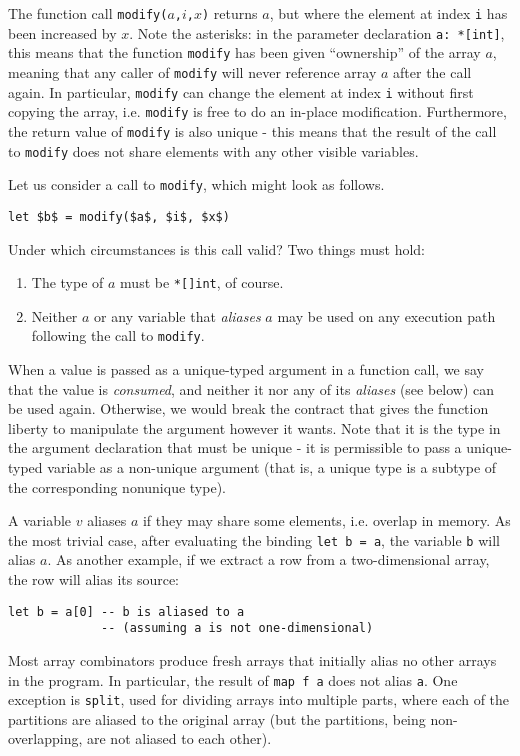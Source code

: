 \documentclass[oneside,11pt]{book}
\begin{document}
The function call \texttt{modify($a$,$i$,$x$)} returns $a$, but where
the element at index \texttt{i} has been increased by $x$.  Note the
asterisks: in the parameter declaration \texttt{a: *[int]}, this means
that the function \texttt{modify} has been given ``ownership'' of the
array $a$, meaning that any caller of \texttt{modify} will never
reference array $a$ after the call again.  In particular,
\texttt{modify} can change the element at index \texttt{i} without
first copying the array, i.e. \texttt{modify} is free to do an
in-place modification.  Furthermore, the return value of
\texttt{modify} is also unique - this means that the result of the
call to \texttt{modify} does not share elements with any other visible
variables.

Let us consider a call to \texttt{modify}, which might look as
follows.

\begin{lstlisting}[mathescape=true]
let $b$ = modify($a$, $i$, $x$)
\end{lstlisting}

Under which circumstances is this call valid?  Two things must hold:
\begin{enumerate}
\item The type of \texttt{$a$} must be \texttt{*[]int}, of course.

\item Neither \texttt{$a$} or any variable that \textit{aliases}
  \texttt{$a$} may be used on any execution path following the call to
  \texttt{modify}.
\end{enumerate}

When a value is passed as a unique-typed argument in a function call,
we say that the value is \textit{consumed}, and neither it nor any of
its \textit{aliases} (see below) can be used again.  Otherwise, we
would break the contract that gives the function liberty to manipulate
the argument however it wants.  Note that it is the type in the
argument declaration that must be unique - it is permissible to pass a
unique-typed variable as a non-unique argument (that is, a unique type
is a subtype of the corresponding nonunique type).

A variable $v$ aliases $a$ if they may share some elements,
i.e. overlap in memory.  As the most trivial case, after evaluating
the binding \texttt{let b = a}, the variable \texttt{b} will alias
\texttt{$a$}.  As another example, if we extract a row from a
two-dimensional array, the row will alias its source:
\begin{lstlisting}
let b = a[0] -- b is aliased to a
             -- (assuming a is not one-dimensional)
\end{lstlisting}
Most array combinators produce fresh arrays that initially alias no
other arrays in the program.  In particular, the result of \texttt{map
  f a} does not alias \texttt{a}.  One exception is \texttt{split},
used for dividing arrays into multiple parts, where each of the
partitions are aliased to the original array (but the partitions,
being non-overlapping, are not aliased to each other).
\end{document}
